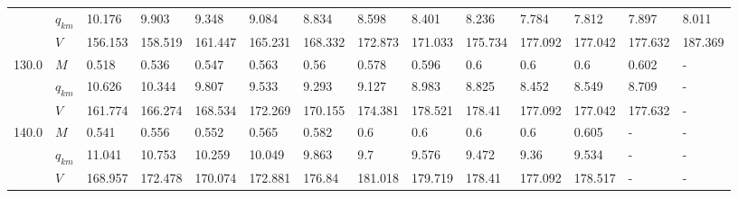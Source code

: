 \begin{tabular}{|l|l|llllllllllll|}
      & $q_{km}$ &   10.176 &    9.903 &                     9.348 &                    9.084 &                     8.834 &                     8.598 &                     8.401 &    8.236 &    7.784\cellcolor{green} &                     7.812 &                     7.897 &    8.011 \\
      & $V$ &  156.153 &  158.519 &                   161.447 &                  165.231 &                   168.332 &                   172.873 &                   171.033 &  175.734 &  177.092\cellcolor{green} &                   177.042 &                   177.632 &  187.369 \\
\hline
130.0 & $M$ &    0.518 &    0.536 &                     0.547 &                    0.563 &                      0.56 &                     0.578 &                     0.596 &      0.6 &      0.6\cellcolor{green} &                       0.6 &                     0.602 &        - \\
      & $q_{km}$ &   10.626 &   10.344 &                     9.807 &                    9.533 &                     9.293 &                     9.127 &                     8.983 &    8.825 &    8.452\cellcolor{green} &                     8.549 &                     8.709 &        - \\
      & $V$ &  161.774 &  166.274 &                   168.534 &                  172.269 &                   170.155 &                   174.381 &                   178.521 &   178.41 &  177.092\cellcolor{green} &                   177.042 &                   177.632 &        - \\
\hline
140.0 & $M$ &    0.541 &    0.556 &                     0.552 &                    0.565 &                     0.582 &                       0.6 &                       0.6 &      0.6 &      0.6\cellcolor{green} &                     0.605 &                         - &        - \\
      & $q_{km}$ &   11.041 &   10.753 &                    10.259 &                   10.049 &                     9.863 &                       9.7 &                     9.576 &    9.472 &     9.36\cellcolor{green} &                     9.534 &                         - &        - \\
      & $V$ &  168.957 &  172.478 &                   170.074 &                  172.881 &                    176.84 &                   181.018 &                   179.719 &   178.41 &  177.092\cellcolor{green} &                   178.517 &                         - &        - \\

\end{tabular}
